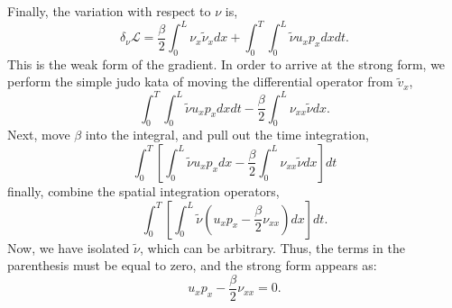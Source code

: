 \documentclass[11pt]{article}
\begin{document}
Finally, the variation with respect to $\nu$ is, 
\begin{equation}
 \delta_\nu \mathcal{L} = \frac{\beta}{2} \int^L_0 \nu_x \tilde \nu_x dx +
  \int_0^T \int_0^L \tilde \nu u_x p_x dx dt. 
\end{equation}
This is the weak form of the gradient. In order to arrive at the strong
form, we perform the simple judo kata of moving the differential
operator from $\tilde v_x$, 
\begin{equation}
  \int_0^T \int_0^L \tilde \nu u_x p_x dx dt -\frac{\beta}{2} \int^L_0
   \nu_{xx} \tilde \nu dx.
\end{equation}
Next, move $\beta$ into the integral, and pull out the time integration, 
\begin{equation}
 \int_0^T \left[ 
	   \int_0^L \tilde \nu u_x p_x dx -\frac{\beta}{2} \int^L_0
	   \nu_{xx} \tilde \nu dx 
       \right] dt
\end{equation}
finally, combine the spatial integration operators, 
\begin{equation}
 \int_0^T \left[ 
	   \int_0^L \tilde \nu \left(u_x p_x - \frac{\beta}{2} \nu_{xx}
			       \right) dx \right] dt.
\end{equation}
Now, we have isolated $\tilde \nu$, which can be arbitrary. Thus, the
terms in the parenthesis must be equal to zero, and the strong form
appears as: 
\begin{equation}
 u_x p_x - \frac{\beta}{2} \nu_{xx} = 0.
\end{equation}
%
%
%
%
%
%

\newpage
\end{document}
